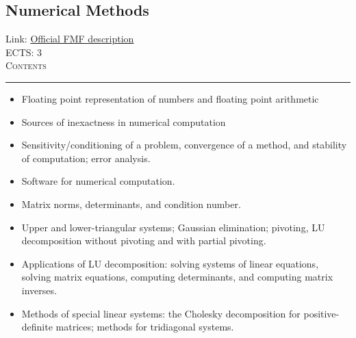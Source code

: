 \documentclass[11pt, a4paper]{article}
\newenvironment{course}[3]{
\subsection{#1}%
Link: \href{#2}{Official FMF description}\\%
ECTS: #3%
\vspace{1ex}
\\
{\large \textsc{Contents}}\\[-0.9ex]%
\rule{\textwidth}{0.5pt}
\vspace{-3ex}
}
{}
\newenvironment{chapter}[1]{
\begin{tcolorbox}[title=#1, breakable]
}
{\end{tcolorbox}}
\begin{document}
\begin{course}{Numerical Methods}{https://www.fmf.uni-lj.si/en/study-physics/programmes/1fiz/2020/7000777/courses/524/}{3}
    \label{numerical_methods}

    \begin{chapter}{Introduction to numerical computation}
        \begin{itemize}

            \item Floating point representation of numbers and floating point arithmetic

            \item Sources of inexactness in numerical computation

            \item Sensitivity/conditioning of a problem, convergence of a method, and stability of computation; error analysis.

            \item Software for numerical computation.
            
        \end{itemize}
    \end{chapter}

    \begin{chapter}{Systems of linear equation}
        \begin{itemize}
            
            \item Matrix norms, determinants, and condition number.

            \item Upper and lower-triangular systems; Gaussian elimination; pivoting, LU decomposition without pivoting and with partial pivoting.

            \item Applications of LU decomposition: solving systems of linear equations, solving matrix equations, computing determinants, and computing matrix inverses.

            \item Methods of special linear systems: the Cholesky decomposition for positive-definite matrices; methods for tridiagonal systems.

            
        \end{itemize}
    \end{chapter}

    \begin{chapter}{Nonlinear equations}
        \begin{itemize}
        

\end{itemize}
\end{chapter}
\end{course}
\end{document}
